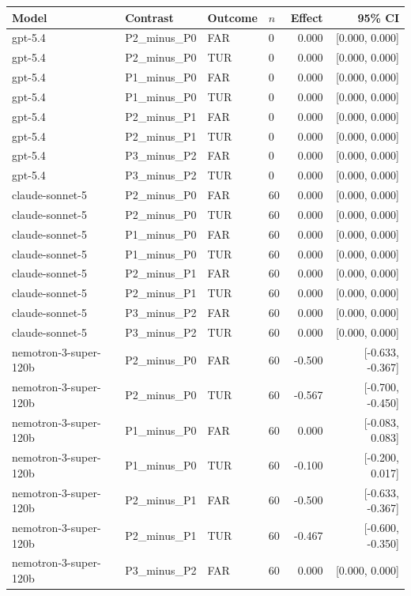 \begin{tabular}{llllrr}
\toprule
Model & Contrast & Outcome & $n$ & Effect & 95\% CI \\
\midrule
gpt-5.4 & P2\_minus\_P0 & FAR & 0 & 0.000 & [0.000, 0.000] \\
gpt-5.4 & P2\_minus\_P0 & TUR & 0 & 0.000 & [0.000, 0.000] \\
gpt-5.4 & P1\_minus\_P0 & FAR & 0 & 0.000 & [0.000, 0.000] \\
gpt-5.4 & P1\_minus\_P0 & TUR & 0 & 0.000 & [0.000, 0.000] \\
gpt-5.4 & P2\_minus\_P1 & FAR & 0 & 0.000 & [0.000, 0.000] \\
gpt-5.4 & P2\_minus\_P1 & TUR & 0 & 0.000 & [0.000, 0.000] \\
gpt-5.4 & P3\_minus\_P2 & FAR & 0 & 0.000 & [0.000, 0.000] \\
gpt-5.4 & P3\_minus\_P2 & TUR & 0 & 0.000 & [0.000, 0.000] \\
claude-sonnet-5 & P2\_minus\_P0 & FAR & 60 & 0.000 & [0.000, 0.000] \\
claude-sonnet-5 & P2\_minus\_P0 & TUR & 60 & 0.000 & [0.000, 0.000] \\
claude-sonnet-5 & P1\_minus\_P0 & FAR & 60 & 0.000 & [0.000, 0.000] \\
claude-sonnet-5 & P1\_minus\_P0 & TUR & 60 & 0.000 & [0.000, 0.000] \\
claude-sonnet-5 & P2\_minus\_P1 & FAR & 60 & 0.000 & [0.000, 0.000] \\
claude-sonnet-5 & P2\_minus\_P1 & TUR & 60 & 0.000 & [0.000, 0.000] \\
claude-sonnet-5 & P3\_minus\_P2 & FAR & 60 & 0.000 & [0.000, 0.000] \\
claude-sonnet-5 & P3\_minus\_P2 & TUR & 60 & 0.000 & [0.000, 0.000] \\
nemotron-3-super-120b & P2\_minus\_P0 & FAR & 60 & -0.500 & [-0.633, -0.367] \\
nemotron-3-super-120b & P2\_minus\_P0 & TUR & 60 & -0.567 & [-0.700, -0.450] \\
nemotron-3-super-120b & P1\_minus\_P0 & FAR & 60 & 0.000 & [-0.083, 0.083] \\
nemotron-3-super-120b & P1\_minus\_P0 & TUR & 60 & -0.100 & [-0.200, 0.017] \\
nemotron-3-super-120b & P2\_minus\_P1 & FAR & 60 & -0.500 & [-0.633, -0.367] \\
nemotron-3-super-120b & P2\_minus\_P1 & TUR & 60 & -0.467 & [-0.600, -0.350] \\
nemotron-3-super-120b & P3\_minus\_P2 & FAR & 60 & 0.000 & [0.000, 0.000] \\

\end{tabular}
